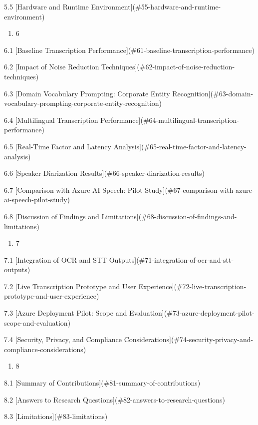 \documentclass[12pt,a4paper]{article}
\begin{document}
5.5 [Hardware and Runtime Environment](\#55-hardware-and-runtime-environment)

\begin{enumerate}
  \item 6
\end{enumerate}

6.1 [Baseline Transcription Performance](\#61-baseline-transcription-performance)

6.2 [Impact of Noise Reduction Techniques](\#62-impact-of-noise-reduction-techniques)

6.3 [Domain Vocabulary Prompting: Corporate Entity Recognition](\#63-domain-vocabulary-prompting-corporate-entity-recognition)

6.4 [Multilingual Transcription Performance](\#64-multilingual-transcription-performance)

6.5 [Real-Time Factor and Latency Analysis](\#65-real-time-factor-and-latency-analysis)

6.6 [Speaker Diarization Results](\#66-speaker-diarization-results)

6.7 [Comparison with Azure AI Speech: Pilot Study](\#67-comparison-with-azure-ai-speech-pilot-study)

6.8 [Discussion of Findings and Limitations](\#68-discussion-of-findings-and-limitations)

\begin{enumerate}
  \item 7
\end{enumerate}

7.1 [Integration of OCR and STT Outputs](\#71-integration-of-ocr-and-stt-outputs)

7.2 [Live Transcription Prototype and User Experience](\#72-live-transcription-prototype-and-user-experience)

7.3 [Azure Deployment Pilot: Scope and Evaluation](\#73-azure-deployment-pilot-scope-and-evaluation)

7.4 [Security, Privacy, and Compliance Considerations](\#74-security-privacy-and-compliance-considerations)

\begin{enumerate}
  \item 8
\end{enumerate}

8.1 [Summary of Contributions](\#81-summary-of-contributions)

8.2 [Answers to Research Questions](\#82-answers-to-research-questions)

8.3 [Limitations](\#83-limitations)
\end{document}
